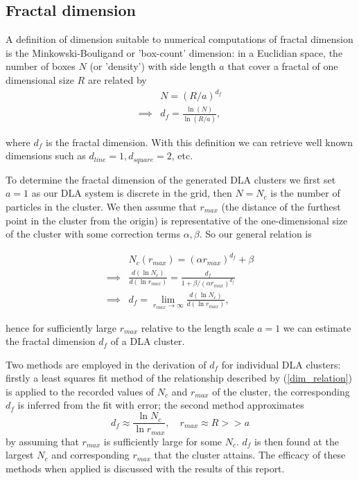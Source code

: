 \documentclass[10pt, twocolumn]{article} %
\begin{document}
\subsection*{Fractal dimension}
  A definition of dimension suitable to numerical computations of fractal dimension is the Minkowski-Bouligand or 'box-count' dimension: in a Euclidian space, the number of boxes $N$ (or 'density') with side length $a$ that cover a fractal of one dimensional size $R$ are related by
  \begin{equation}
      \begin{aligned}
        & N = (R/a)^{d_f}\\
        \implies & d_f = \frac{\ln(N)}{\ln(R/a)},
      \end{aligned}
      \label{dim_definition}
  \end{equation}

  where $d_f$ is the fractal dimension. With this definition we can retrieve well known dimensions such as $d_{line} = 1, d_{square} = 2$, etc.

      To determine the fractal dimension of the generated DLA clusters we first set $a=1$ as our DLA system is discrete in the grid, then $N=N_c$ is the number of particles in the cluster. We then assume that $r_{max}$ (the distance of the furthest point in the cluster from the origin) is representative of the one-dimensional size of the cluster with some correction terms $\alpha, \beta$. So our general relation is

  \begin{equation}
    \begin{aligned}
    & N_c(r_{max}) = (\alpha r_{max})^{d_f}+\beta\\
    \implies & \frac{d(\ln{N_c})}{d(\ln{r_{max}})} = \frac{d_f}{1 + \beta/(\alpha r_{max})^{d_f}}\\
    \implies & d_f = \lim\limits_{r_{max} \to \infty} \frac{d(\ln{N_c})}{d(\ln{r_{max}})},
    \end{aligned}
    \label{dim_relation}
  \end{equation}

  hence for sufficiently large $r_{max}$ relative to the length scale $a = 1$ we can estimate the fractal dimension $d_f$ of a DLA cluster. 

  Two methods are employed in the derivation of $d_f$ for individual DLA clusters: firstly a least squares fit method of the relationship described by (\ref{dim_relation}) is applied to the recorded values of $N_c$ and $r_{max}$ of the cluster, the corresponding $d_f$ is inferred from the fit with error; the second method approximates
  \begin{equation}
    d_f \approx \frac{\ln{N_c}}{\ln{r_{max}}}, \quad r_{max} \approx R >> a
    \label{dim_approx}
  \end{equation}
      by assuming that $r_{max}$ is sufficiently large for some $N_c$. $d_f$ is then found at the largest $N_c$ and corresponding $r_{max}$ that the cluster attains. The efficacy of these methods when applied is discussed with the results of this report.
\end{document}
